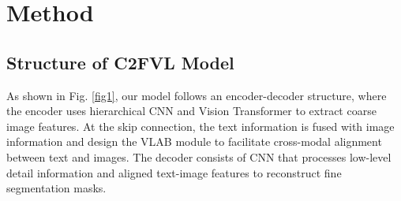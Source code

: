 \documentclass{article}
\begin{document}
\vspace{-3mm}
\section{Method}
\label{sec:method}
\vspace{-2mm}
\subsection{Structure of C2FVL Model}
\vspace{-1mm}
As shown in Fig. \ref{fig1}, our model follows an encoder-decoder structure, where the encoder uses hierarchical CNN and Vision Transformer to extract coarse image features. At the skip connection, the text information is fused with image information and design the VLAB module to facilitate cross-modal alignment between text and images. The decoder consists of CNN that processes low-level detail information and aligned text-image features to reconstruct fine segmentation masks.

\vspace{-4mm}
\end{document}
